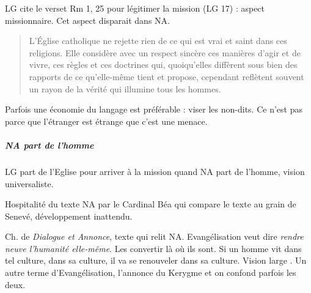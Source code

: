        LG cite le verset Rm 1, 25 pour légitimer la mission (LG 17) : aspect missionnaire. Cet aspect disparait dans NA. 
       \begin{quote}
         L’Église catholique ne rejette rien de ce qui est vrai et saint dans ces religions. Elle considère avec un respect sincère ces manières d’agir et de vivre, ces règles et ces doctrines qui, quoiqu’elles diffèrent sous bien des rapports de ce qu’elle-même tient et propose, cependant reflètent souvent un rayon de la vérité qui illumine tous les hommes.  
       \end{quote}

Parfois une économie du langage est préférable : viser les non-dits. Ce n’est pas parce que l’étranger est étrange que c’est une menace.   

   
   \subparagraph{NA part de l'homme} LG part de l'Eglise pour arriver à la mission quand NA part de l'homme, vision universaliste. 
   
   Hospitalité du texte NA par le Cardinal Béa qui compare le texte au grain de Senevé, développement inattendu.
   
   
   

Ch. de \textit{Dialogue et Annonce}, texte qui relit NA. Evangélisation veut dire \textit{rendre neuve l'humanité elle-même}. Les convertir là où ils sont. Si un homme vit dans tel culture, dans sa culture, il va se renouveler dans sa culture. Vision large .
Un autre terme d'Evangélisation, l'annonce du Kerygme et on confond parfois les deux.

